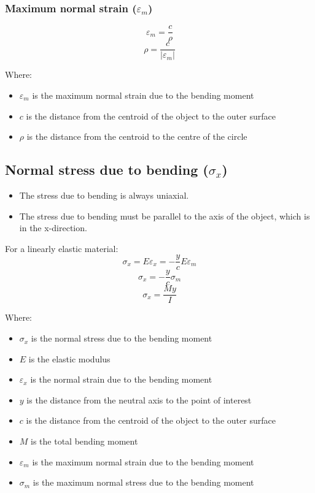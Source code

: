\documentclass[11pt]{article}
\begin{document}
\subsubsection{Maximum normal strain (\(\varepsilon_m\))}
\label{sec:orgd788598}
\[\varepsilon_m = \frac{c}{\rho}\]
\[\rho = \frac{c}{\left| \varepsilon_m \right|}\]

Where:
\begin{itemize}
\item \(\varepsilon_m\) is the maximum normal strain due to the bending moment
\item \(c\) is the distance from the centroid of the object to the outer surface
\item \(\rho\) is the distance from the centroid to the centre of the circle
\end{itemize}

\newpage

\subsection{Normal stress due to bending (\(\sigma_x\))}
\label{sec:org10f6079}
\begin{itemize}
\item The stress due to bending is always uniaxial.
\item The stress due to bending must be parallel to the axis of the object, which is in the x-direction.
\end{itemize}

For a linearly elastic material:
\[\sigma_x = E \varepsilon_x = - \frac{y}{c} E \varepsilon_m\]
\[\sigma_x = - \frac{y}{c} \sigma_m\]
\[\sigma_x = \frac{My}{I}\]

Where:
\begin{itemize}
\item \(\sigma_x\) is the normal stress due to the bending moment
\item \(E\) is the elastic modulus
\item \(\varepsilon_x\) is the normal strain due to the bending moment
\item \(y\) is the distance from the neutral axis to the point of interest
\item \(c\) is the distance from the centroid of the object to the outer surface
\item \(M\) is the total bending moment
\item \(\varepsilon_m\) is the maximum normal strain due to the bending moment
\item \(\sigma_m\) is the maximum normal stress due to the bending moment
\end{itemize}
\end{document}

